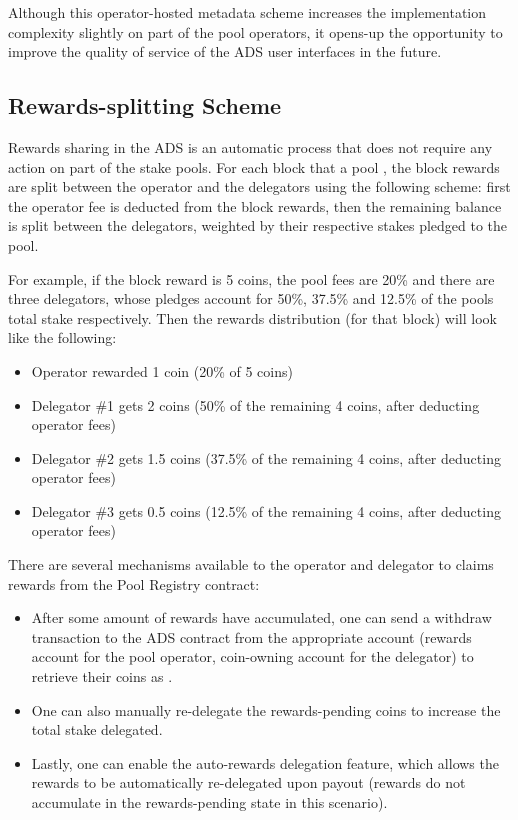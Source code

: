 Although this operator-hosted metadata scheme increases the implementation complexity slightly on part of the pool operators, it opens-up the opportunity to improve the quality of service of the ADS user interfaces in the future. 

\subsection{Rewards-splitting Scheme} \label{rewards_splitting}

Rewards sharing in the ADS is an automatic process that does not require any action on part of the stake pools. For each block that a pool , the block rewards are split between the operator and the delegators using the following scheme: first the operator fee is deducted from the block rewards, then the remaining balance is split between the delegators, weighted by their respective stakes pledged to the pool.

For example, if the block reward is 5 coins, the pool fees are 20\% and there are three delegators, whose pledges account for 50\%, 37.5\% and 12.5\% of the pools total stake respectively. Then the rewards distribution (for that block) will look like the following: 
\begin{itemize}[label=--,nosep]
    \item Operator rewarded 1 coin (20\% of 5 coins)
    \item Delegator \#1 gets 2 coins (50\% of the remaining 4 coins, after deducting operator fees)
    \item Delegator \#2 gets 1.5 coins (37.5\% of the remaining 4 coins, after deducting operator fees)
    \item Delegator \#3 gets 0.5 coins (12.5\% of the remaining 4 coins, after deducting operator fees)
\end{itemize}

There are several mechanisms available to the operator and delegator to claims rewards from the Pool Registry contract: 
\begin{itemize}[label=--,nosep]
    \item After some amount of rewards have accumulated, one can send a withdraw transaction to the ADS contract from the appropriate account (rewards account for the pool operator, coin-owning account for the delegator) to retrieve their coins as . 
    \item One can also manually re-delegate the rewards-pending coins to increase the total stake delegated. 
    \item Lastly, one can enable the auto-rewards delegation feature, which allows the rewards to be automatically re-delegated upon payout (rewards do not accumulate in the rewards-pending state in this scenario). 
\end{itemize}


